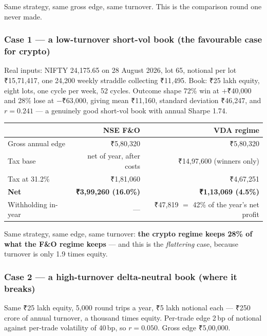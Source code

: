 \documentclass[11pt,a4paper]{article}
\newcommand{\rs}{₹}
\begin{document}
Same strategy, same gross edge, same turnover. This is the comparison round one
never made.

\subsubsection{Case 1 --- a low-turnover short-vol book (the favourable case for crypto)}

Real inputs: NIFTY 24{,}175.65 on 28 August 2026, lot 65, notional per lot
\rs 15{,}71{,}417, one 24{,}200 weekly straddle collecting \rs 11{,}495. Book:
\rs 25 lakh equity, eight lots, one cycle per week, 52 cycles. Outcome shape 72\%
win at $+$\rs 40{,}000 and 28\% lose at $-$\rs 63{,}000, giving mean \rs 11{,}160,
standard deviation \rs 46{,}247, and $r = 0.241$ --- a genuinely good short-vol
book with annual Sharpe 1.74.

\begin{center}
\begin{tabular}{@{}lrr@{}}
\toprule
& \textbf{NSE F\&O} & \textbf{VDA regime} \\
\midrule
Gross annual edge & \rs 5{,}80{,}320 & \rs 5{,}80{,}320 \\
Tax base & net of year, after costs & \rs 14{,}97{,}600 (winners only) \\
Tax at 31.2\% & \rs 1{,}81{,}060 & \rs 4{,}67{,}251 \\
\textbf{Net} & \textbf{\rs 3{,}99{,}260 (16.0\%)} & \textbf{\rs 1{,}13{,}069 (4.5\%)} \\
Withholding in-year & --- & \rs 47{,}819 $=$ 42\% of the year's net profit \\
\bottomrule
\end{tabular}
\end{center}

Same strategy, same edge, same turnover: \textbf{the crypto regime keeps 28\% of
what the F\&O regime keeps} --- and this is the \emph{flattering} case, because
turnover is only 1.9 times equity.

\subsubsection{Case 2 --- a high-turnover delta-neutral book (where it breaks)}

Same \rs 25 lakh equity, 5{,}000 round trips a year, \rs 5 lakh notional each ---
\rs 250 crore of annual turnover, a thousand times equity. Per-trade edge 2\,bp of
notional against per-trade volatility of 40\,bp, so $r = 0.050$. Gross edge
\rs 5{,}00{,}000.
\end{document}
